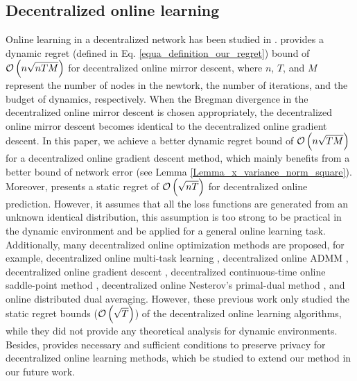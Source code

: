 \documentclass{article}
\begin{document}
\subsection{Decentralized online learning}
Online learning in a decentralized network has been studied in \citep{8015179Shahram,Kamp:2014:CDO,Koppel-8352032,Zhang2018,pmlr-v70-zhang17g,Xu2015,tcns-7353155,cdc-7798923,acc-7172037,tcns-7479495,Benczur:2018ww,tkde-6311406}.  \citet{8015179Shahram} provides a dynamic regret (defined in Eq. \eqref{equa_definition_our_regret}) bound of ${\mathcal{O}\left( n\sqrt{nTM} \right)}$ for decentralized online mirror descent, where $n$, $T$, and $M$ represent the number of nodes in the newtork, the number of iterations, and the budget of dynamics, respectively.  When the Bregman divergence in the decentralized online mirror descent is chosen appropriately, the decentralized online mirror descent becomes identical to the decentralized online gradient descent. 
In this paper, we achieve a better dynamic regret bound of  ${\mathcal{O}\left( n\sqrt{TM} \right)}$ for a decentralized online gradient descent method, which mainly benefits from a better bound of network error (see Lemma \ref{Lemma_x_variance_norm_square}). Moreover, \citet{Kamp:2014:CDO} presents a static regret of  ${\mathcal{O}\left( \sqrt{nT} \right)}$ for decentralized online prediction. However,  it assumes that all the loss functions are generated from an unknown identical distribution,
 this assumption is too strong to be practical in the dynamic environment and be applied for a general online learning task. Additionally, many decentralized online optimization methods are proposed, for example, decentralized online multi-task learning \citep{Zhang2018}, decentralized online ADMM \citep{Xu2015}, decentralized online gradient descent \citep{tcns-7353155}, decentralized continuous-time online saddle-point method \citep{cdc-7798923}, decentralized online  Nesterov's primal-dual method \citep{acc-7172037,tcns-7479495}, and online distributed dual averaging\citep{6760092}.
However, these previous work only studied  the static regret bounds (${\mathcal{O}\left( \sqrt{T} \right)}$) of the decentralized online learning algorithms, while they did not provide any theoretical analysis for dynamic environments. 
Besides,  \citet{tkde-6311406} provides necessary and sufficient conditions to preserve privacy for decentralized online learning methods, which be studied to extend our method in our future work.
\end{document}
